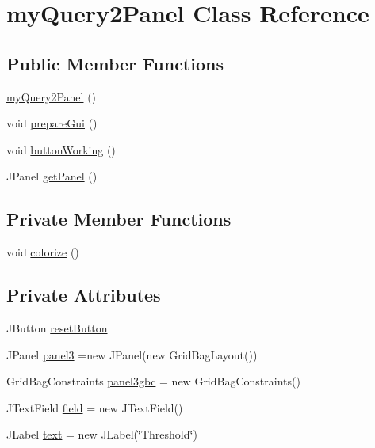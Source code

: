 \hypertarget{classmy_query2_panel}{}\section{my\+Query2\+Panel Class Reference}
\label{classmy_query2_panel}
\subsection*{Public Member Functions}
\begin{DoxyCompactItemize}
\item 
\hyperlink{classmy_query2_panel_a6bc36043976b346eb7e46eea21956042}{my\+Query2\+Panel} ()
\item 
void \hyperlink{classmy_query2_panel_a734aedb77732969bf2c9834104a0d59e}{prepare\+Gui} ()
\item 
void \hyperlink{classmy_query2_panel_a7ff73944523f85b4c3a79a4c019f73d3}{button\+Working} ()
\item 
J\+Panel \hyperlink{classmy_query2_panel_a7977bb42f9d5959684f805e08337d27b}{get\+Panel} ()
\end{DoxyCompactItemize}
\subsection*{Private Member Functions}
\begin{DoxyCompactItemize}
\item 
void \hyperlink{classmy_query2_panel_adc03fb0398ab530769a51ae88531349a}{colorize} ()
\end{DoxyCompactItemize}
\subsection*{Private Attributes}
\begin{DoxyCompactItemize}
\item 
J\+Button \hyperlink{classmy_query2_panel_a6a14902bb9074acd9cb34b7990caf5cb}{reset\+Button}
\item 
J\+Panel \hyperlink{classmy_query2_panel_aa8e92271cbba0fcab6c9947a0c27a86d}{panel3} =new J\+Panel(new Grid\+Bag\+Layout())
\item 
Grid\+Bag\+Constraints \hyperlink{classmy_query2_panel_a361db8f93b44e873eaf71d0c1b7053ca}{panel3gbc} = new Grid\+Bag\+Constraints()
\item 
J\+Text\+Field \hyperlink{classmy_query2_panel_a0e8b5a13ce5b78ea87609934978e9190}{field} = new J\+Text\+Field()
\item 
J\+Label \hyperlink{classmy_query2_panel_a7073a23d25ce19b57d706330db2ddd4f}{text} = new J\+Label(\char`\"{}Threshold\char`\"{})
\end{DoxyCompactItemize}


